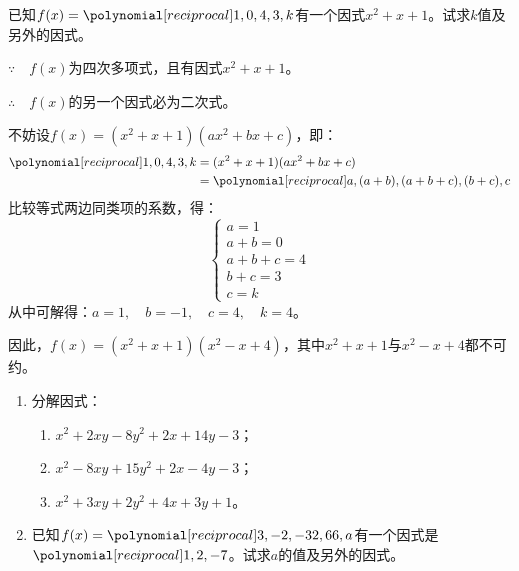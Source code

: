 \begin{example}
    已知$f(x)=\poly{1,0,4,3,k}$有一个因式$x^2+x+1$。试求$k$值及另外的因式。
\end{example}

\begin{solution}
    $\because\quad f(x)$为四次多项式，且有因式$x^2+x+1$。

    $\therefore\quad f(x)$的另一个因式必为二次式。

    不妨设$f(x)=(x^2+x+1)(ax^2+bx+c)$，即：
\[\begin{split}
    \poly{1,0,4,3,k}&=(x^2+x+1)(ax^2+bx+c)\\
    &=\poly{a,(a+b),(a+b+c),(b+c),c}
\end{split}\]
比较等式两边同类项的系数，得：
\[\begin{cases}
    a=1\\
    a+b=0\\
    a+b+c=4\\
    b+c=3\\
    c=k
\end{cases}\]
从中可解得：$a=1,\quad b=-1,\quad c=4,\quad k=4$。

因此，$f(x)=(x^2+x+1)(x^2-x+4)$，其中$x^2+x+1$与$x^2-x+4$都不可约。
\end{solution}

\begin{ex}
\begin{enumerate}
    \item 分解因式：
\begin{enumerate}
    \item $x^2+2xy-8y^2+2x+14y-3$；
    \item $x^2-8xy+15y^2+2x-4y-3$；
    \item $x^2+3xy+2y^2+4x+3y+1$。
\end{enumerate}
\item  已知$f(x)=\poly{3,-2,-32,66,a}$有一个因式是$\poly{1,2,-7}$。试求$a$的值及另外的因式。
\end{enumerate}    
\end{ex}

